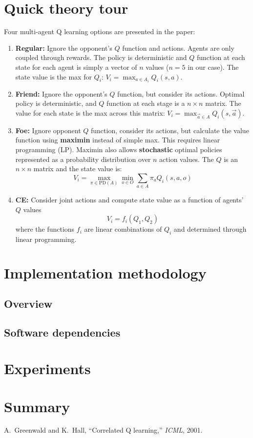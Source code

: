 \documentclass[conference]{IEEEtran}
\begin{document}
\section{Quick theory tour}
Four multi-agent Q learning options are presented in the paper:
\begin{enumerate}
\item {\bf Regular:} Ignore the opponent's $Q$ function and actions. Agents are only coupled through rewards. The policy is deterministic and $Q$ function at each state for each agent is simply a vector of $n$ values ($n=5$ in our case). The state value is the max for $Q_i$: $V_i =\max_{a\in A_i} Q_i(s,a)$. 
%
\item {\bf Friend: } Ignore the opponent's $Q$ function, but consider its actions. Optimal policy is deterministic, and $Q$ function at each stage is a $n\times n$ matrix. The value for each state is the max across this matrix: $V_i = \max_{\vec{a}\in A} Q_i(s, \vec{a})$.
%
\item {\bf Foe: } Ignore opponent $Q$ function, consider its actions, but calculate the value function using {\bf maximin} instead of simple max. This requires linear programming (LP). Maximin also allows {\bf stochastic} optimal policies represented as a probability distribution over $n$ action values. The $Q$ is an $n\times n$ matrix and the state value is: 
%
\begin{equation}
V_i = \max_{\pi\in\text{PD}(A)}\min_{o\in O}\sum_{a\in A}\pi_a Q_i(s, a, o)
\end{equation}
%
\item {\bf CE: } Consider joint actions and compute state value as a function of agents' $Q$ values
%
\begin{equation}
V_i = f_i(Q_1, Q_2)
\end{equation}
where the functions $f_i$ are linear combinations of $Q_i$ and determined through linear programming. 
\end{enumerate}
\section{Implementation methodology}
\subsection{Overview}
\subsection{Software dependencies}
\section{Experiments}
\section*{Summary}
\begin{thebibliography}{1}
A.~Greenwald and K.~Hall, ``Correlated Q learning,'' {\em ICML}, 2001.
\end{thebibliography}
\end{document}
